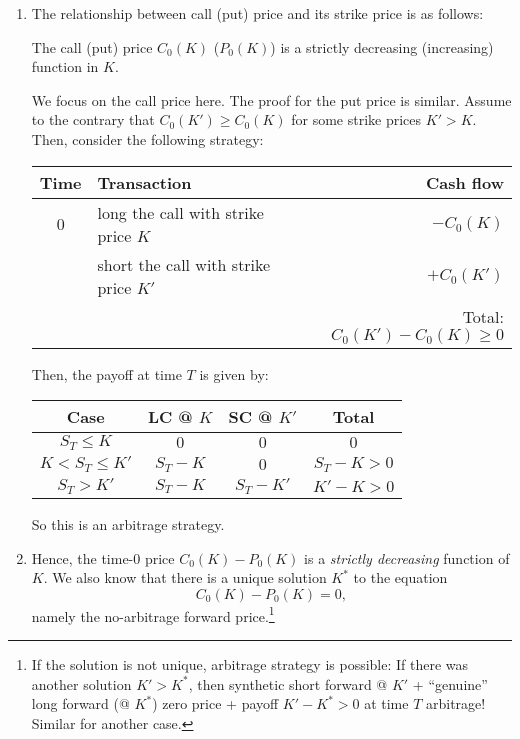 \begin{enumerate}
\item The relationship between call (put) price and its strike price is as follows:
\begin{proposition}
\label{prp:call-put-price-strike-relationship}
The call (put) price \(C_0(K)\) (\(P_0(K)\)) is a strictly decreasing
(increasing) function in \(K\).
\end{proposition}
\begin{pf}
We focus on the call price here. The proof for the put price is similar. Assume
to the contrary that \(C_0(K')\ge C_0(K)\) for some strike prices \(K'>K\).
Then, consider the following strategy:
\begin{center}
\begin{tabular}{clr}
\toprule
Time&Transaction&Cash flow\\
\midrule
0&long the call with strike price \(K\)&\(-C_0(K)\)\\
&short the call with strike price \(K'\)&\(+C_0(K')\)\\
&&Total: \(C_0(K')-C_0(K)\ge 0\)\\
\bottomrule
\end{tabular}
\end{center}
Then, the payoff at time \(T\) is given by:
\begin{center}
\begin{tabular}{cccc}
\toprule
Case&LC @ \(K\)&SC @ \(K'\)& Total\\
\midrule
\(S_T\le K\)&\(0\)&\(0\)&\(0\)\\
\(K<S_T\le K'\)&\(S_T-K\)&\(0\)&\(S_T-K>0\)\\
\(S_T>K'\)&\(S_T-K\)&\(S_T-K'\)&\(K'-K>0\)\\
\bottomrule
\end{tabular}
\end{center}
So this is an arbitrage strategy.
\end{pf}

\item Hence, the time-0 price \(C_0(K)-P_0(K)\) is a \emph{strictly decreasing}
function of \(K\). We also know that there is a unique solution \(K^*\) to the
equation
\[
C_0(K)-P_0(K)=0,
\]
namely the no-arbitrage forward price.\footnote{If the solution is not unique,
arbitrage strategy is possible: If there was another solution \(K'>K^*\), then
synthetic short forward @ \(K'\) + ``genuine'' long forward (@ \(K^*\))
 zero price + payoff \(K'-K^*>0\) at time \(T\)
 arbitrage! Similar for another case.}


\end{enumerate}
